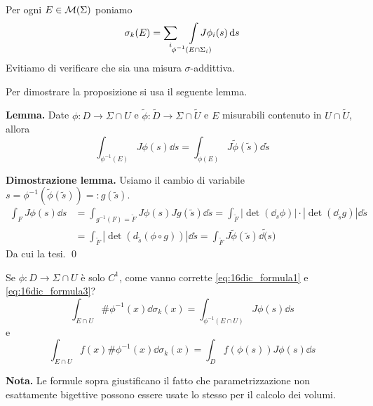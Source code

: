 Per ogni $E \in \mathcal{M}(\Sigma)$ poniamo 
%
$$
	\sigma_k (E) = \sum_i \quad  \int\limits_{\mathclap{\phi^{-1}(E \cap \Sigma_i)}} J \phi_i(s) \dd s
$$
%
Evitiamo di verificare che sia una misura $\sigma$-addittiva.

Per dimostrare la proposizione si usa il seguente lemma.

\textbf{Lemma.} Date $\phi \colon D \to \Sigma \cap U$ e $\tilde{\phi} \colon \tilde{D} \to \Sigma \cap \tilde{U}$ e $E$ misurabili contenuto in $U \cap \tilde{U}$, allora
%
\begin{equation}
	\label{eq:16dic_formula2} \tag{2}
	\int_{\phi^{-1}(E)} J\phi(s) \dd s = \int_{\tilde{\phi}(E)} J\tilde{\phi}(\tilde{s}) \dd \tilde{s}
\end{equation}
%

\textbf{Dimostrazione lemma.} Usiamo il cambio di variabile $s = \phi^{-1}(\tilde{\phi}(\tilde{s})) =: g(\tilde{s})$.
\begin{align*}
	\int_F J\phi(s) \dd s & = \int_{g^{-1}(F) = \tilde{F}} J\phi(s) Jg(\tilde{s}) \dd \tilde{s}
	= \int_{\tilde{F}} |\det(\dd_s \phi)| \cdot | \det(\dd_{\tilde{s}}g)| \dd \tilde{s} \\
	& = \int_{\tilde{F}} \left| \det (d_{\tilde{s}}(\phi \circ g)) \right| \dd \tilde{s}
	= \int_{\tilde{F}} J \tilde{\phi}(\tilde{s}) \dd \tilde(s)
\end{align*}
%
Da cui la tesi.
\qed


Se $\phi \colon D \to \Sigma \cap U$ è solo $C^1$, come vanno corrette \eqref{eq:16dic_formula1} e \eqref{eq:16dic_formula3}?
\begin{equation}
	\tag{1'}
	\int_{E \cap U} \# \phi^{-1}(x) \dd \sigma_k(x) = \int_{\phi^{-1}(E \cap U)} J\phi(s) \dd s
\end{equation}
e
\begin{equation}
	\tag{3'}
	\int_{E \cap U} f(x) \# \phi^{-1}(x) \dd \sigma_k (x) = \int_D f(\phi(s)) J\phi(s) \dd s
\end{equation}

\textbf{Nota.} Le formule sopra giustificano il fatto che parametrizzazione non esattamente bigettive possono essere usate lo stesso per il calcolo dei volumi.

